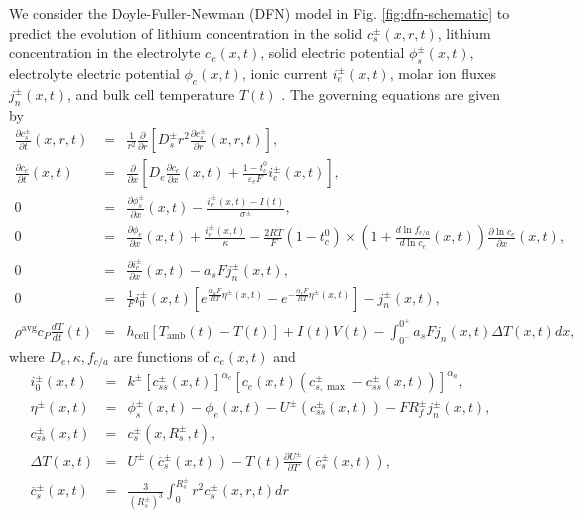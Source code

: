 \documentclass[12pt]{article}
\begin{document}
We consider the Doyle-Fuller-Newman (DFN) model in Fig. \ref{fig:dfn-schematic} to predict the evolution of lithium concentration in the solid $c_{s}^{\pm}(x,r,t)$, lithium concentration in the electrolyte $c_{e}(x,t)$, solid electric potential $\phi_{s}^{\pm}(x,t)$, electrolyte electric potential $\phi_{e}(x,t)$, ionic current $i_{e}^{\pm}(x,t)$, molar ion fluxes $j_{n}^{\pm}(x,t)$, and bulk cell temperature $T(t)$ \cite{Thomas2002}. The governing equations are given by
\begin{eqnarray}
	\frac{\partial c_{s}^{\pm}}{\partial t}(x,r,t) &=& \frac{1}{r^{2}} \frac{\partial}{\partial r} \left[ D_{s}^{\pm} r^{2} \frac{\partial c_{s}^{\pm}}{\partial r}(x,r,t) \right], \label{eqn:cs} \\
	\frac{\partial c_{e}}{\partial t}(x,t) &=& \frac{\partial}{\partial x} \left[ D_{e} \frac{\partial c_{e}}{\partial x}(x,t) + \frac{1 - t_{c}^{0}}{\varepsilon_{e} F} i_{e}^{\pm}(x,t) \right], \label{eqn:ce} \\
	0 &=& \frac{\partial \phi_{s}^{\pm}}{\partial x}(x,t) - \frac{i_{e}^{\pm}(x,t) - I(t)}{\sigma^{\pm}}, \label{eqn:phis} \\
	0 &=& \frac{\partial \phi_{e}}{\partial x}(x,t) + \frac{i_{e}^{\pm}(x,t)}{\kappa} - \frac{2RT}{F}(1 - t_{c}^{0}) \times \left(1 + \frac{d \ln f_{c/a}}{d \ln c_{e}}(x,t) \right) \frac{\partial \ln c_{e}}{\partial x}(x,t), \label{eqn:phie} \quad \\
	0 &=& \frac{\partial i_{e}^{\pm}}{\partial x}(x,t) - a_{s} F j_{n}^{\pm}(x,t), \label{eqn:ie} \\
	0 &=& \frac{1}{F} i_{0}^{\pm}(x,t) \left[e^{\frac{\alpha_{a}F}{RT} \eta^{\pm}(x,t)} - e^{-\frac{\alpha_{c}F}{RT} \eta^{\pm}(x,t)} \right] - j_{n}^{\pm}(x,t), \label{eqn:bv} \\
	\rho^{\textrm{avg}} c_{P} \frac{dT}{dt}(t) &=& h_{\textrm{cell}} \left[ T_{\textrm{amb}}(t) - T(t) \right] + I(t) V(t) -\int_{0^{-}}^{0^{+}} a_{s} F j_{n}(x,t) \Delta T(x,t) dx,
\end{eqnarray}
where $D_{e}, \kappa, f_{c/a}$ are functions of $c_{e}(x,t)$ and
\begin{eqnarray}
	i_{0}^{\pm}(x,t) &=& k^{\pm}  \left[ c_{ss}^{\pm}(x,t) \right]^{\alpha_{c}} \left[c_{e}(x,t) \left(c_{s,\max}^{\pm} - c_{ss}^{\pm}(x,t)  \right) \right]^{\alpha_{a}}, \label{eqn:i0} \\
	\eta^{\pm}(x,t) &=& \phi_{s}^{\pm}(x,t) - \phi_{e}(x,t) - U^{\pm}(c_{ss}^{\pm}(x,t)) - F R_{f}^{\pm} j_{n}^{\pm}(x,t), \label{eqn:eta} \\
	c_{ss}^{\pm}(x,t) &=& c_{s}^{\pm}(x,R_{s}^{\pm},t), \label{eqn:css} \\
	\Delta T(x,t) &=& U^{\pm}(\overline{c}^{\pm}_{s}(x,t)) - T(t) \frac{\partial U^{\pm}}{\partial T}(\overline{c}^{\pm}_{s}(x,t)), \\
	\overline{c}_{s}^{\pm}(x,t) &=& \frac{3}{(R_{s}^{\pm})^{3}} \int_{0}^{R_{s}^{\pm}} r^{2} c_{s}^{\pm}(x,r,t) dr \label{eqn:cbulk}
\end{eqnarray}
\end{document}
